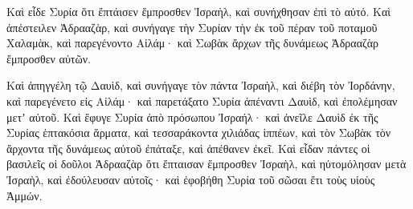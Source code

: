 {\par }{\PP {}Καὶ εἶδε Συρία ὅτι ἔπτάισεν ἔμπροσθεν Ἰσραὴλ, καὶ συνήχθησαν ἐπὶ τὸ αὐτό.
Καὶ ἀπέστειλεν Ἀδρααζὰρ, καὶ συνήγαγε τὴν Συρίαν τὴν ἐκ τοῦ πέραν τοῦ ποταμοῦ Χαλαμὰκ, καὶ παρεγένοντο Αἱλάμ· καὶ Σωβὰκ ἄρχων τῆς δυνάμεως Ἀδρααζὰρ ἔμπροσθεν αὐτῶν.
\par }{\PP {}Καὶ ἀπηγγέλη τῷ Δαυὶδ, καὶ συνήγαγε τὸν πάντα Ἰσραὴλ, καὶ διέβη τὸν Ἰορδάνην, καὶ παρεγένετο εἰς Αἰλάμ· καὶ παρετάξατο Συρία ἀπέναντι Δαυὶδ, καὶ ἐπολέμησαν μετʼ αὐτοῦ.
Καὶ ἔφυγε Συρία ἀπὸ πρόσωπου Ἰσραήλ· καὶ ἀνεῖλε Δαυὶδ ἐκ τῆς Συρίας ἑπτακόσια ἅρματα, καὶ τεσσαράκοντα χιλιάδας ἱππέων, καὶ τὸν Σωβὰκ τὸν ἄρχοντα τῆς δυνάμεως αὐτοῦ ἐπάταξε, καὶ ἀπέθανεν ἐκεῖ.
Καὶ εἶδαν πάντες οἱ βασιλεῖς οἱ δοῦλοι Ἀδρααζὰρ ὅτι ἔπταισαν ἔμπροσθεν Ἰσραὴλ, καὶ ηὐτομόλησαν μετὰ Ἰσραὴλ, καὶ ἐδούλευσαν αὐτοῖς· καὶ ἐφοβήθη Συρία τοῦ σῶσαι ἔτι τοὺς υἱοὺς Ἀμμών.

}
